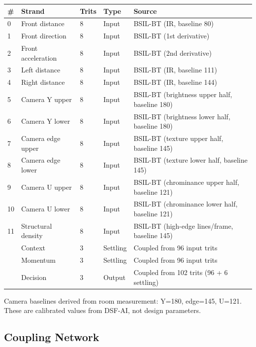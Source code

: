 \documentclass[11pt, a4paper]{article}
\begin{document}
\begin{center}
\begin{tabular}{@{}lllll@{}}
\toprule
\textbf{\#} & \textbf{Strand} & \textbf{Trits} & \textbf{Type} & \textbf{Source} \\
\midrule
0  & Front distance     & 8 & Input    & BSIL-BT (IR, baseline 80) \\
1  & Front direction    & 8 & Input    & BSIL-BT (1st derivative) \\
2  & Front acceleration & 8 & Input    & BSIL-BT (2nd derivative) \\
3  & Left distance      & 8 & Input    & BSIL-BT (IR, baseline 111) \\
4  & Right distance     & 8 & Input    & BSIL-BT (IR, baseline 144) \\
5  & Camera Y upper     & 8 & Input    & BSIL-BT (brightness upper half, baseline 180) \\
6  & Camera Y lower     & 8 & Input    & BSIL-BT (brightness lower half, baseline 180) \\
7  & Camera edge upper  & 8 & Input    & BSIL-BT (texture upper half, baseline 145) \\
8  & Camera edge lower  & 8 & Input    & BSIL-BT (texture lower half, baseline 145) \\
9  & Camera U upper     & 8 & Input    & BSIL-BT (chrominance upper half, baseline 121) \\
10 & Camera U lower     & 8 & Input    & BSIL-BT (chrominance lower half, baseline 121) \\
11 & Structural density & 8 & Input    & BSIL-BT (high-edge lines/frame, baseline 145) \\
   & Context            & 3 & Settling & Coupled from 96 input trits \\
   & Momentum           & 3 & Settling & Coupled from 96 input trits \\
   & Decision           & 3 & Output   & Coupled from 102 trits (96 + 6 settling) \\
\bottomrule
\end{tabular}
\end{center}

Camera baselines derived from room measurement: Y=180, edge=145,
U=121. These are calibrated values from DSF-AI, not design
parameters.

\subsection{Coupling Network}
\end{document}
